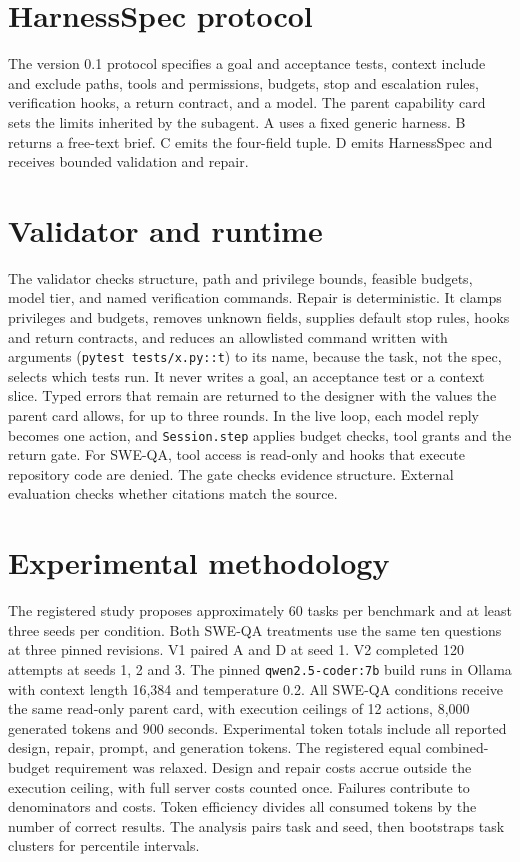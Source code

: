 \documentclass[sigconf,nonacm]{acmart}
\newcommand{\artifact}[1]{\nolinkurl{#1}}
\begin{document}
\section{HarnessSpec protocol}
The version 0.1 protocol specifies a goal and acceptance tests, context include
and exclude paths, tools and permissions, budgets, stop and escalation rules,
verification hooks, a return contract, and a model. The parent capability card
sets the limits inherited by the subagent. A uses a fixed generic harness. B
returns a free-text brief. C emits the four-field tuple. D emits HarnessSpec
and receives bounded validation and repair.

\section{Validator and runtime}
The validator checks structure, path and privilege bounds, feasible budgets,
model tier, and named verification commands. Repair is deterministic. It
clamps privileges and budgets, removes unknown fields, supplies default stop
rules, hooks and return contracts, and reduces an allowlisted command written
with arguments (\texttt{pytest tests/x.py::t}) to its name, because the task,
not the spec, selects which tests run. It never writes a goal, an acceptance
test or a context slice. Typed errors that remain are returned to the
designer with the values the parent card allows, for up to three rounds. In the live loop, each
model reply becomes one action, and \texttt{Session.step} applies budget checks,
tool grants and the return gate. For SWE-QA, tool access is read-only and
hooks that execute repository code are denied. The gate checks evidence
structure. External evaluation checks whether citations match the source.

\section{Experimental methodology}
The registered study proposes approximately 60 tasks per benchmark and at least
three seeds per condition. Both SWE-QA treatments use the same ten
questions at three pinned revisions. V1 paired A and D at seed 1.
V2 completed 120 attempts at seeds 1, 2 and 3.
The pinned \artifact{qwen2.5-coder:7b} build runs in Ollama with context
length 16,384 and temperature 0.2. All SWE-QA conditions receive the same read-only parent card, with execution
ceilings of 12 actions, 8,000 generated tokens and 900 seconds.
Experimental token totals include all reported design, repair, prompt, and
generation tokens. The registered
equal combined-budget requirement was relaxed. Design and repair costs
accrue outside the execution ceiling, with full server costs counted once.
Failures contribute to denominators and costs. Token efficiency divides
all consumed tokens by the number of correct results. The analysis pairs
task and seed, then bootstraps task clusters for percentile intervals.
\end{document}
